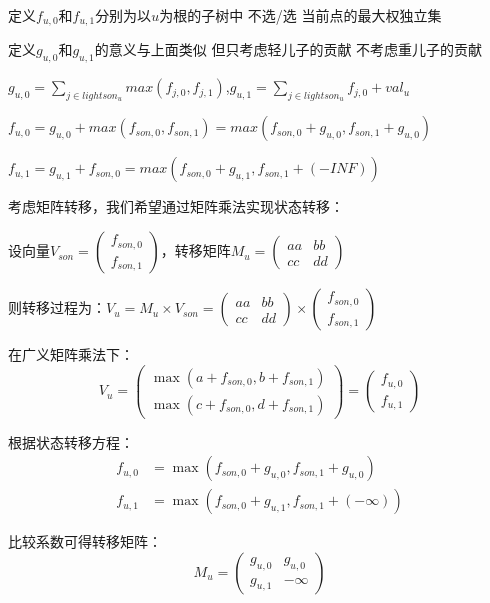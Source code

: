 \documentclass[a4paper, fontset=none]{ctexart}
\begin{document}
定义$f_{u, 0}$和$f_{u, 1}$分别为以$u$为根的子树中 不选/选 当前点的最大权独立集

定义$g_{u, 0}$和$g_{u, 1}$的意义与上面类似 但只考虑轻儿子的贡献 不考虑重儿子的贡献

$g_{u, 0}=\sum\limits_{j\in lightson_u}max(f_{j, 0}, f_{j, 1})$,$g_{u, 1}={\sum\limits_{j\in lightson_u}f_{j, 0}}+val_u$

$f_{u, 0}=g_{u, 0}+max(f_{son, 0}, f_{son, 1})=max(f_{son, 0}+g_{u, 0}, f_{son, 1}+g_{u, 0})$

$f_{u, 1}=g_{u, 1}+f_{son, 0}=max(f_{son, 0}+g_{u, 1}, f_{son, 1}+(-INF))$

考虑矩阵转移，我们希望通过矩阵乘法实现状态转移：

设向量$V_{son} = \begin{pmatrix}f_{son, 0} \\ f_{son, 1}\end{pmatrix}$，转移矩阵$M_u = \begin{pmatrix}a a&b b\\c c&d d\end{pmatrix}$

则转移过程为：$V_u = M_u \times V_{son} = \begin{pmatrix}a a&b b\\c c&d d\end{pmatrix} \times \begin{pmatrix}f_{son, 0} \\ f_{son, 1}\end{pmatrix}$

在广义矩阵乘法下：
$$V_u = \begin{pmatrix}\max(a+f_{son, 0}, b+f_{son, 1}) \\ \max(c+f_{son, 0}, d+f_{son, 1})\end{pmatrix} = \begin{pmatrix}f_{u, 0} \\ f_{u, 1}\end{pmatrix}$$

根据状态转移方程：
\begin{align}
f_{u, 0} &= \max(f_{son, 0}+g_{u, 0}, f_{son, 1}+g_{u, 0}) \\
f_{u, 1} &= \max(f_{son, 0}+g_{u, 1}, f_{son, 1}+(-\infty))
\end{align}

比较系数可得转移矩阵：
$$M_u = \begin{pmatrix}g_{u, 0} & g_{u, 0} \\ g_{u, 1} & -\infty\end{pmatrix}$$
\end{document}
